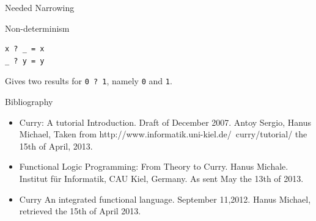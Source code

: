 \documentclass{beamer}
\begin{document}
\begin{section}{Needed Narrowing}
\begin{subsection}{Non-determinism}
\begin{frame}[fragile]
\begin{verbatim}
x ? _ = x
_ ? y = y
\end{verbatim}

  Gives two results for \verb|0 ? 1|, namely \verb|0| and \verb|1|.
  
\end{frame}

\end{subsection}
\end{section}
\begin{section}{Bibliography}
  \begin{frame}
    \begin{itemize}
    \item Curry: A tutorial Introduction. Draft of December 2007. Antoy Sergio, Hanus Michael, Taken from http://www.informatik.uni-kiel.de/~curry/tutorial/ the 15th of April, 2013.


    \item Functional Logic Programming: From Theory to Curry. Hanus Michale. Institut f\"ur Informatik, CAU Kiel, Germany. As sent May the 13th of 2013.

    \item Curry An integrated functional language. September 11,2012. Hanus Michael, retrieved the 15th of April 2013.
      
    \end{itemize}

\end{frame}
\end{section}
\end{document}
